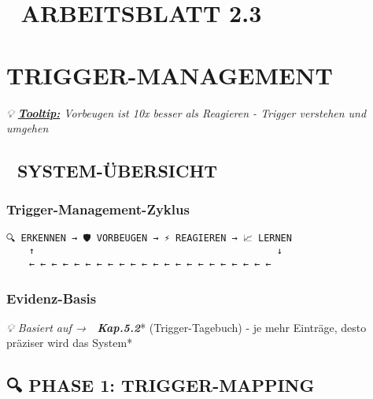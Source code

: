 %


\hypertarget{arbeitsblatt-2.3}{%
\section{\texorpdfstring{🎢 \textbf{ARBEITSBLATT 2.3} }{🎢 ARBEITSBLATT 2.3 }}\label{arbeitsblatt-2.3}}

\hypertarget{trigger-management}{%
\section{\texorpdfstring{\textbf{TRIGGER-MANAGEMENT}}{TRIGGER-MANAGEMENT}}\label{trigger-management}}

\emph{💡 \textbf{\ul{Tooltip:}} Vorbeugen ist 10x besser als Reagieren - Trigger verstehen und umgehen}

\hypertarget{system-uxfcbersicht}{%
\subsection{\texorpdfstring{🎯 \textbf{SYSTEM-ÜBERSICHT}}{🎯 SYSTEM-ÜBERSICHT}}\label{system-uxfcbersicht}}

\hypertarget{trigger-management-zyklus}{%
\subsubsection{\texorpdfstring{\textbf{Trigger-Management-Zyklus}}{Trigger-Management-Zyklus}}\label{trigger-management-zyklus}}

\begin{verbatim}
🔍 ERKENNEN → 🛡️ VORBEUGEN → ⚡ REAGIEREN → 📈 LERNEN
    ↑                                           ↓
    ← ← ← ← ← ← ← ← ← ← ← ← ← ← ← ← ← ← ← ← ← ←
\end{verbatim}

\hypertarget{evidenz-basis}{%
\subsubsection{\texorpdfstring{\textbf{Evidenz-Basis}}{Evidenz-Basis}}\label{evidenz-basis}}

\emph{💡 Basiert auf → 📝 \textbf{Kap.5.2}}* (Trigger-Tagebuch) - je mehr Einträge, desto präziser wird das System*

\hypertarget{phase-1-trigger-mapping}{%
\subsection{\texorpdfstring{🔍 \textbf{PHASE 1: TRIGGER-MAPPING}}{🔍 PHASE 1: TRIGGER-MAPPING}}\label{phase-1-trigger-mapping}}

